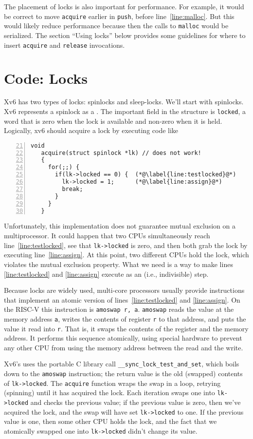 The placement of locks is also important for performance.
For example, it would be correct to move
\lstinline{acquire}
earlier in
\lstinline{push},
before line~\ref{line:malloc}.
But this would likely reduce performance because then the calls
to
\lstinline{malloc}
would be serialized.
The section ``Using locks'' below provides some guidelines for where to insert
\lstinline{acquire}
and
\lstinline{release}
invocations.
\section{Code: Locks}
Xv6 has two types of locks: spinlocks and sleep-locks.
We'll start with spinlocks.
Xv6 represents a spinlock as a
.
The important field in the structure is
\lstinline{locked},
a word that is zero when the lock is available
and non-zero when it is held.
Logically, xv6 should acquire a lock by executing code like
\begin{lstlisting}[numbers=left,firstnumber=21]
   void
   acquire(struct spinlock *lk) // does not work!
   {
     for(;;) {
       if(lk->locked == 0) {  (*@\label{line:testlocked}@*)
         lk->locked = 1;      (*@\label{line:assign}@*)
         break;
       }
     }
   }
\end{lstlisting}
Unfortunately, this implementation does not
guarantee mutual exclusion on a multiprocessor.
It could happen that two CPUs simultaneously
reach line~\ref{line:testlocked}, see that 
\lstinline{lk->locked}
is zero, and then both grab the lock by executing line~\ref{line:assign}.
At this point, two different CPUs hold the lock,
which violates the mutual exclusion property.
What we need is a way to
make lines \ref{line:testlocked} and \ref{line:assign} execute as an
(i.e., indivisible) step.

Because locks are widely used,
multi-core processors usually provide instructions that
implement an atomic version of
lines~\ref{line:testlocked} and \ref{line:assign}.
On the RISC-V this instruction is
\lstinline{amoswap r, a}.
\lstinline{amoswap}
reads the value at the memory address {\tt a},
writes the contents of register {\tt r} to that address,
and puts the value it read into {\tt r}.
That is, it swaps the contents of the register and the memory address.
It performs this sequence atomically, using special
hardware to prevent any
other CPU from using the memory address between the read and the write.

Xv6's 
uses the portable C library call 
\lstinline{__sync_lock_test_and_set},
which boils down to the
\lstinline{amoswap}
instruction;
the return value is the old (swapped) contents of
\lstinline{lk->locked}.
The
\lstinline{acquire}
function wraps the swap in a loop, retrying (spinning) until it has
acquired the lock.
Each iteration swaps one into
\lstinline{lk->locked} 
and checks the previous value;
if the previous value is zero, then we've acquired the
lock, and the swap will have set 
\lstinline{lk->locked}
to one.
If the previous value is one, then some other CPU
holds the lock, and the fact that we atomically swapped one into
\lstinline{lk->locked}
didn't change its value.

